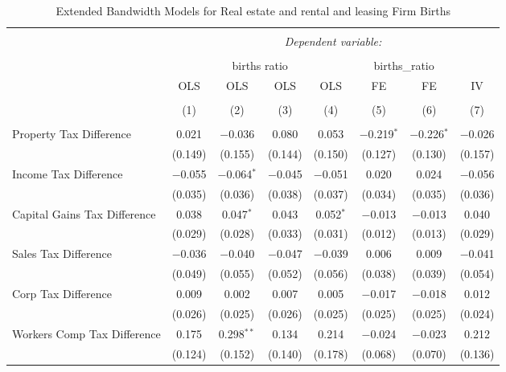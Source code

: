 
\begin{table}[!htbp] \centering 
  \caption{Extended Bandwidth Models for  Real estate and rental and leasing Firm Births} 
  \label{} 
\begin{tabular}{@{\extracolsep{5pt}}lccccccc} 
\\[-1.8ex]\hline 
\hline \\[-1.8ex] 
 & \multicolumn{7}{c}{\textit{Dependent variable:}} \\ 
\cline{2-8} 
\\[-1.8ex] & \multicolumn{4}{c}{births ratio} & \multicolumn{2}{c}{births\_ratio} &   \\ 
 & OLS & OLS & OLS & OLS & FE & FE & IV \\ 
\\[-1.8ex] & (1) & (2) & (3) & (4) & (5) & (6) & (7)\\ 
\hline \\[-1.8ex] 
 Property Tax Difference & 0.021 & $-$0.036 & 0.080 & 0.053 & $-$0.219$^{*}$ & $-$0.226$^{*}$ & $-$0.026 \\ 
  & (0.149) & (0.155) & (0.144) & (0.150) & (0.127) & (0.130) & (0.157) \\ 
  Income Tax Difference & $-$0.055 & $-$0.064$^{*}$ & $-$0.045 & $-$0.051 & 0.020 & 0.024 & $-$0.056 \\ 
  & (0.035) & (0.036) & (0.038) & (0.037) & (0.034) & (0.035) & (0.036) \\ 
  Capital Gains Tax Difference & 0.038 & 0.047$^{*}$ & 0.043 & 0.052$^{*}$ & $-$0.013 & $-$0.013 & 0.040 \\ 
  & (0.029) & (0.028) & (0.033) & (0.031) & (0.012) & (0.013) & (0.029) \\ 
  Sales Tax Difference & $-$0.036 & $-$0.040 & $-$0.047 & $-$0.039 & 0.006 & 0.009 & $-$0.041 \\ 
  & (0.049) & (0.055) & (0.052) & (0.056) & (0.038) & (0.039) & (0.054) \\ 
  Corp Tax Difference & 0.009 & 0.002 & 0.007 & 0.005 & $-$0.017 & $-$0.018 & 0.012 \\ 
  & (0.026) & (0.025) & (0.026) & (0.025) & (0.025) & (0.025) & (0.024) \\ 
  Workers Comp Tax Difference & 0.175 & 0.298$^{**}$ & 0.134 & 0.214 & $-$0.024 & $-$0.023 & 0.212 \\ 
  & (0.124) & (0.152) & (0.140) & (0.178) & (0.068) & (0.070) & (0.136) \\ 

\end{tabular}
\end{table}
